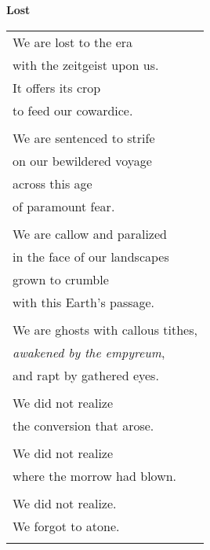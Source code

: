 \documentclass{article}
\begin{document}
\begin{center}
\textbf{Lost}\\
\begin{tabular}{l}
\\
We are lost to the era \\
with the zeitgeist upon us. \\
It offers its crop \\
to feed our cowardice. \\
\\
We are sentenced to strife \\
on our bewildered voyage \\
across this age \\
of paramount fear. \\
\\
We are callow and paralized \\
in the face of our landscapes \\
grown to crumble \\
with this Earth's passage. \\
\\
We are ghosts with callous tithes, \\
\textit{awakened by the empyreum}, \\
and rapt by gathered eyes. \\
\\
We did not realize \\
the conversion that arose. \\
\\
We did not realize \\
where the morrow had blown. \\ %
\\
We did not realize. \\
We forgot to atone. \\
\\
\end{tabular}
\end{center}
\end{document}
